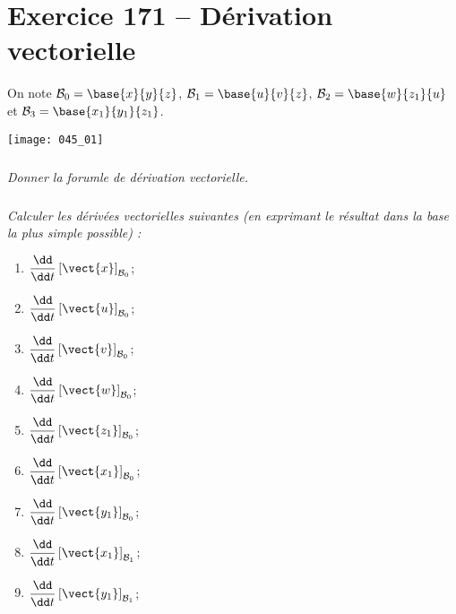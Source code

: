 \section*{Exercice 171 -- Dérivation vectorielle}
\setcounter{exo}{0}


On note $\mathcal{B}_0=\base{x}{y}{z}$, $\mathcal{B}_1=\base{u}{v}{z}$, $\mathcal{B}_2=\base{w}{z_1}{u}$ et $\mathcal{B}_3=\base{x_1}{y_1}{z_1}$.
\begin{center}
\texttt{[image: 045\_01]}
\end{center}


\subparagraph{}
\textit{Donner la forumle de dérivation vectorielle.}

\subparagraph{}
\textit{Calculer les dérivées vectorielles suivantes (en exprimant le résultat dans la base la plus simple possible) : }
\begin{multicols}{3}
\begin{enumerate}
\item $\dfrac{\dd }{\dd t}\left[ \vect{x} \right]_{\mathcal{B}_0}$;
\item $\dfrac{\dd }{\dd t}\left[ \vect{u} \right]_{\mathcal{B}_0}$;
\item $\dfrac{\dd }{\dd t}\left[ \vect{v} \right]_{\mathcal{B}_0}$;
\item $\dfrac{\dd }{\dd t}\left[ \vect{w} \right]_{\mathcal{B}_0}$;
\item $\dfrac{\dd }{\dd t}\left[ \vect{z_1} \right]_{\mathcal{B}_0}$;
\item $\dfrac{\dd }{\dd t}\left[ \vect{x_1} \right]_{\mathcal{B}_0}$;
\item $\dfrac{\dd }{\dd t}\left[ \vect{y_1} \right]_{\mathcal{B}_0}$;
\item $\dfrac{\dd }{\dd t}\left[ \vect{x_1} \right]_{\mathcal{B}_1}$;
\item $\dfrac{\dd }{\dd t}\left[ \vect{y_1} \right]_{\mathcal{B}_1}$;

\end{enumerate}
\end{multicols}


